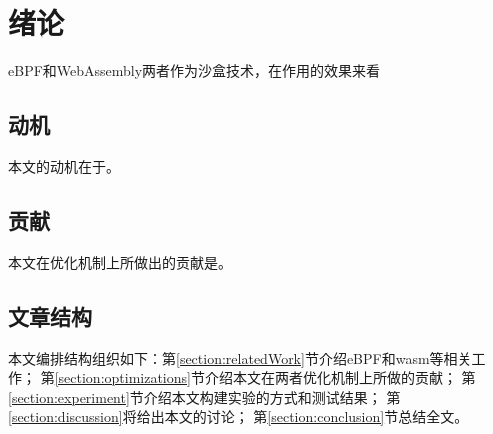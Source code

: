 \section{绪论}
eBPF和WebAssembly两者作为沙盒技术，在作用的效果来看
\subsection{动机}
本文的动机在于。
\subsection{贡献}
本文在优化机制上所做出的贡献是。
\subsection{文章结构}
    本文编排结构组织如下：第\ref{section:relatedWork}节介绍eBPF和wasm等相关工作；
    第\ref{section:optimizations}节介绍本文在两者优化机制上所做的贡献；
    第\ref{section:experiment}节介绍本文构建实验的方式和测试结果；
    第\ref{section:discussion}将给出本文的讨论；
    第\ref{section:conclusion}节总结全文。
